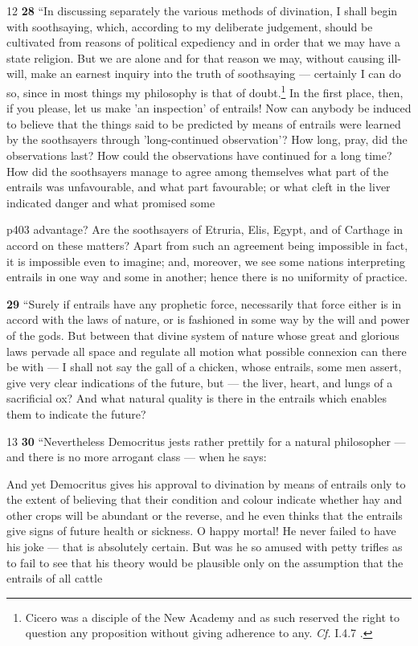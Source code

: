12
\textbf{28} ``In discussing separately the various methods of divination, I shall begin with soothsaying, which, according to my deliberate judgement, should be cultivated from reasons of political expediency and in order that we may have a state religion. But we are alone and for that reason we may, without causing ill-will, make an earnest inquiry into the truth of soothsaying \texthebrew{—} certainly I can do so, since in most things my philosophy is that of doubt.\texthebrew{}\footnote{Cicero was a disciple of the New Academy and as such reserved the right to question any proposition without giving adherence to any. \emph{Cf.}
I.4.7 .

} In the first place, then, if you please, let us make 'an inspection' of entrails! Now can anybody be induced to believe that the things said to be predicted by means of entrails were learned by the soothsayers through 'long-continued observation'? How long, pray, did the observations last? How could the observations have continued for a long time? How did the soothsayers manage to agree among themselves what part of the entrails was unfavourable, and what part favourable; or what cleft in the liver indicated danger and what promised some

p403 advantage? Are the soothsayers of Etruria, Elis, Egypt, and of Carthage in accord on these matters? Apart from such an agreement being impossible in fact, it is impossible even to imagine; and, moreover, we see some nations interpreting entrails in one way and some in another; hence there is no uniformity of practice.

\textbf{29} ``Surely if entrails have any prophetic force, necessarily that force either is in accord with the laws of nature, or is fashioned in some way by the will and power of the gods. But between that divine system of nature whose great and glorious laws pervade all space and regulate all motion what possible connexion can there be with \texthebrew{—} I shall not say the gall of a chicken, whose entrails, some men assert, give very clear indications of the future, but \texthebrew{—} the liver, heart, and lungs of a sacrificial ox? And what natural quality is there in the entrails which enables them to indicate the future?

13
\textbf{30} ``Nevertheless Democritus jests rather prettily for a natural philosopher \texthebrew{—} and there is no more arrogant class \texthebrew{—} when he says:

And yet Democritus gives his approval to divination by means of entrails only to the extent of believing that their condition and colour indicate whether hay and other crops will be abundant or the reverse, and he even thinks that the entrails give signs of future health or sickness. O happy mortal! He never failed to have his joke \texthebrew{—} that is absolutely certain. But was he so amused with petty trifles as to fail to see that his theory would be plausible only on the assumption that the entrails of all cattle

